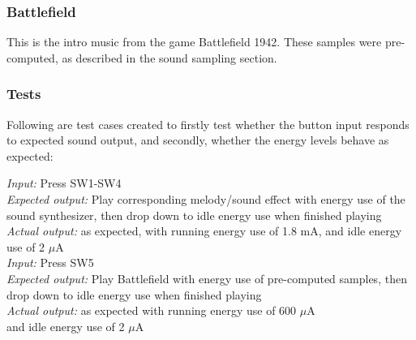 \subsubsection{Battlefield}

This is the intro music from the game Battlefield 1942. These samples were pre-computed, as described in the sound sampling section. 

\subsubsection{Tests}

Following are test cases created to firstly test whether the button input responds to expected sound output, and secondly, whether the energy levels behave as expected:



\emph{Input: } Press SW1-SW4\\
\emph{Expected output: } Play corresponding melody/sound effect with energy use of the sound synthesizer, then drop down to idle energy use when finished playing\\
\emph{Actual output: } as expected, with running energy use of 1.8 mA, and idle energy use of 2 $\mu$A \\


\emph{Input: } Press SW5\\
\emph{Expected output: } Play Battlefield with energy use of pre-computed samples, then drop down to idle energy use when finished playing\\
\emph{Actual output: } as expected with running energy use of 600 $\mu$A \\ and idle energy use of 2 $\mu$A \\ 

